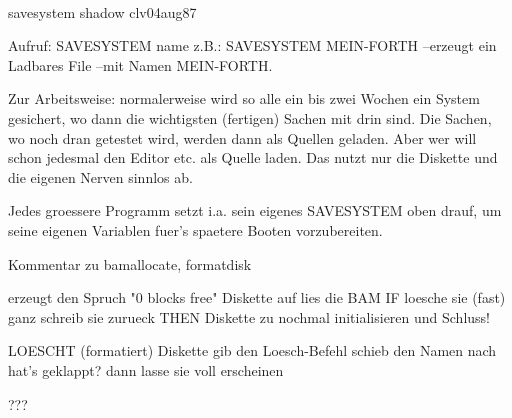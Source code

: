 \\ savesystem shadow          clv04aug87 
                                         
                                         
Aufruf: SAVESYSTEM name                  
  z.B.: SAVESYSTEM MEIN-FORTH            
        --erzeugt ein Ladbares File      
        --mit Namen MEIN-FORTH.          
                                         
  Zur Arbeitsweise: normalerweise        
  wird so alle ein bis zwei Wochen       
  ein System gesichert, wo dann          
  die wichtigsten (fertigen) Sachen      
  mit drin sind. Die Sachen, wo noch     
  dran getestet wird, werden dann        
  als Quellen geladen. Aber wer          
  will schon jedesmal den Editor etc.    
  als Quelle laden. Das nutzt nur        
  die Diskette und die eigenen Nerven    
  sinnlos ab.                            
                                         
  Jedes groessere Programm setzt         
  i.a. sein eigenes SAVESYSTEM oben      
  drauf, um seine eigenen Variablen      
  fuer's spaetere Booten vorzubereiten.  
                                        
Kommentar zu bamallocate, formatdisk     
                                         
erzeugt den Spruch "0 blocks free"       
 Diskette auf                            
 lies die BAM                            
  IF loesche sie (fast) ganz             
     schreib sie zurueck                 
  THEN  Diskette zu                      
 nochmal initialisieren                  
 und Schluss!                            
                                         
LOESCHT (formatiert) Diskette            
 gib den Loesch-Befehl                   
 schieb den Namen nach                   
  hat's geklappt?                        
 dann lasse sie voll erscheinen          
                                         
                                         
                                         
                                         
                                         
                                         
                                         
                                         
                                        
???                                      
                                         
